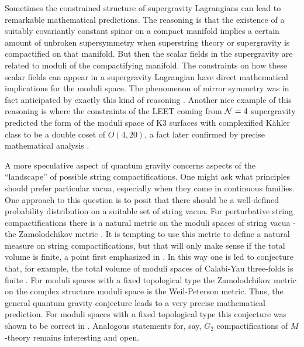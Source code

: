 \documentclass[12pt]{article}
\begin{document}
Sometimes the constrained structure of supergravity Lagrangians can
lead to remarkable mathematical predictions. 
The reasoning is that the existence of a suitably 
covariantly constant spinor on a compact manifold 
implies a certain amount of unbroken supersymmetry when 
superstring theory or supergravity is compactified on that 
manifold. But then the scalar fields in the supergravity 
are related to moduli of the compactifying manifold. The 
constraints on how these scalar fields can appear in a 
supergravity Lagrangian have direct mathematical implications 
for the moduli space. 
The phenomenon of mirror symmetry was in fact anticipated 
by exactly this kind of reasoning \cite{Dixon:1987bg,Dixon:1989fj,Lerche:1989uy}.
 Another nice example of this reasoning is   \cite{Seiberg:1988pf} 
where the constraints of the 
LEET coming from ${\cal{N}}=4$ supergravity predicted the form of the moduli 
space of K3 surfaces with complexified K\"ahler class to be a double coset of $O(4,20)$, a fact later confirmed 
by precise mathematical analysis 
\cite{Aspinwall:1994rg,Aspinwall:1995td}. 

A more speculative aspect of quantum gravity concerns 
aspects of the ``landscape'' of possible string compactifications. 
One might ask what principles should prefer particular vacua, 
especially when they come in continuous families. 
One approach to this question is to posit that there should be a well-defined probability distribution on a suitable set of 
string vacua. For perturbative string compactifications 
there is a natural metric on the moduli spaces of string 
vacua - the Zamolodchikov metric \cite{Zamolodchikov:1986gt}. 
It is tempting 
to use this metric to define a natural measure on string 
compactifications, but that will only make sense if the 
total volume is finite, a point first emphasized in 
\cite{Horne:1994mi}. In this way one is led to conjecture 
that, for example, the total volume of moduli spaces of  Calabi-Yau three-folds is finite
\cite{Horne:1994mi}. For moduli spaces with a fixed topological 
type the Zamolodchikov metric on the complex structure moduli space is the Weil-Peterson metric. Thus, the general quantum gravity conjecture leads to a very precise mathematical prediction. 
For moduli spaces with a fixed topological type this   conjecture was shown to be correct in \cite{Douglas:2005hq}. Analogous statements for, say,
$G_2$ compactifications of $M$-theory remains interesting and open. 
 
\end{document}
